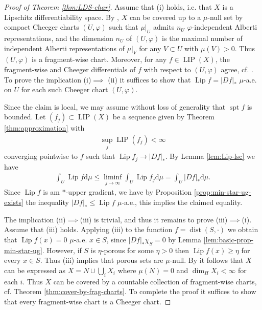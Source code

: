 \documentclass{amsart}
\numberwithin{equation}{section}
\newcommand{\spt}{\operatorname{spt}}
\newcommand{\dist}{\operatorname{dist}}
\newcommand{\Lip}{\operatorname{Lip}}
\newcommand{\LIP}{\operatorname{LIP}}
\newcommand{\ud}{\mathrm {d}}
\begin{document}
\begin{proof}[Proof of Theorem \ref{thm:LDS-char}]
	Assume that (i) holds, i.e. that $X$ is a Lipschitz differentiability space. By \cite[Theorem 6.6]{bate15}, $X$ can be covered up to a $\mu$-null set by compact Cheeger charts $(U,\varphi)$ such that $\mu|_U$ admits $n_U$ $\varphi$-independent Alberti representations, and the dimension $n_U$ of $(U,\varphi)$ is the maximal number of independent Alberti representations of $\mu|_V$ for any $V\subset U$ with $\mu(V)>0$. Thus $(U,\varphi)$ is a fragment-wise chart. Moreover, for any $f\in \LIP(X)$, the fragment-wise and Cheeger differentials of $f$ with respect to $(U,\varphi)$ agree, cf. \cite[Lemma 3.8 or Corollary 6.7]{bate15}. To prove the implication (i)$\implies$ (ii) it suffices to show that $\Lip f=|Df|_\ast$ $\mu$-a.e. on $U$ for each such Cheeger chart $(U,\varphi)$.
	
	
	Since the claim is local, we may assume without loss of generality that $\spt f$ is bounded. Let $(f_j)\subset \LIP(X)$ be a sequence given by Theorem \ref{thm:approximation} with
	\begin{align*}
		\sup_j \LIP(f_j)<\infty
	\end{align*}
	converging pointwise to $f$ such that $\Lip f_j\to |Df|_\ast$. By Lemma \ref{lem:Lip-lsc} we have 
	\begin{align*}
		\int_U\Lip f\ud\mu\le \liminf_{j\to\infty}\int_U\Lip f_j\ud\mu=\int_U|Df|_\ast\ud \mu.
	\end{align*}
	Since $\Lip f$ is am $\ast$-upper gradient, we have by Proposition \ref{prop:min-star-ug-exists} the inequality $|Df|_\ast\le \Lip f$ $\mu$-a.e., this implies the claimed equality.
	
	The implication (ii)$\implies$(iii) is trivial, and thus it remains to prove (iii)$\implies$(i). Assume that (iii) holds. Applying (iii) to the function $f=\dist(S,\cdot)$ we obtain that $\Lip f(x)=0$ $\mu$-a.e. $x\in S$, since $|Df|_\ast \chi_S=0$ by Lemma \ref{lem:basic-prop-min-star-ug}. However, if $S$ is $\eta$-porous for some $\eta>0$ then $\Lip f(x)\ge \eta$ for every $x\in S$. Thus (iii) implies that porous sets are $\mu$-null. By \cite[Lemma 8.3]{bate15}  it follows that $X$ can be expressed as $X=N\cup \bigcup_iX_i$ where $\mu(N)=0$ and $\dim_HX_i<\infty$ for each $i$. Thus $X$ can be covered by a countable collection of fragment-wise charts, cf. Theorem \ref{thm:cover-by-frag-charts}. To complete the proof it suffices to show that every fragment-wise chart is a Cheeger chart.
	

\end{proof}
\end{document}
